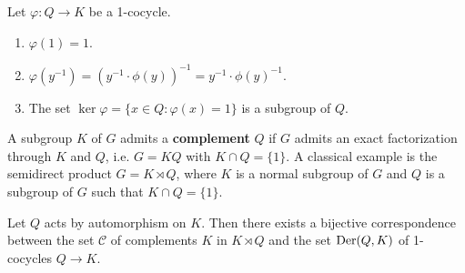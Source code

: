 
\begin{exercise}
	\label{xca:1cocycle}
	Let $\varphi\colon Q\to K$ be a 1-cocycle. 
	\begin{enumerate}
		\item $\varphi(1)=1$.
		\item $\varphi(y^{-1})=(y^{-1}\cdot\phi(y))^{-1}=y^{-1}\cdot\phi(y)^{-1}$.
		\item The set $\ker\varphi=\{x\in Q:\varphi(x)=1\}$ is a subgroup of $Q$. 
	\end{enumerate}
\end{exercise}

A subgroup $K$ of $G$ admits a \textbf{complement} $Q$ if $G$ admits an exact factorization 
through $K$ and $Q$, i.e. $G=KQ$ with $K\cap Q=\{1\}$. 
A classical example is the semidirect product $G=K\rtimes Q$, where $K$ is a normal subgroup of $G$ 
and $Q$ is a subgroup of $G$ such that $K\cap Q=\{1\}$. 

\begin{theorem}
	\label{thm:complements}
	Let $Q$ acts by automorphism on $K$. Then there exists a bijective correspondence between
	the set $\mathcal{C}$ of complements $K$ in $K\rtimes Q$ and the set 
    $\operatorname{Der}(Q,K)$ of 1-cocycles $Q\to K$.
\end{theorem}

